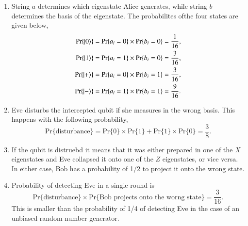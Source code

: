 \begin{solution}
\begin{enumerate}[label=(\alph*)]
    \item String $a$ determines which eigenstate Alice generates, while string $b$ determines the basis of the eigenstate. The probabilites ofthe four states are given below,
    \begin{align*}
        \text{Pr}\{\left| 0 \right\rangle\} & = \text{Pr}\{a_i=0\} \times \text{Pr}\{b_i=0\} = \frac{1}{16}, \\
        \text{Pr}\{\left| 1 \right\rangle\} & = \text{Pr}\{a_i=1\} \times \text{Pr}\{b_i=0\} = \frac{3}{16}, \\
        \text{Pr}\{\left| + \right\rangle\} & = \text{Pr}\{a_i=0\} \times \text{Pr}\{b_i=1\} = \frac{3}{16}, \\
        \text{Pr}\{\left| - \right\rangle\} & = \text{Pr}\{a_i=1\} \times \text{Pr}\{b_i=1\} = \frac{9}{16}.
    \end{align*}
    \item Eve disturbs the intercepted qubit if she measures in the wrong basis. This happens with the following probability,
    \begin{equation*}
        \text{Pr}\{\text{disturbance}\} = \text{Pr}\{0\} \times \text{Pr}\{1\} + \text{Pr}\{1\} \times \text{Pr}\{0\} = \frac{3}{8}.
    \end{equation*}
    \item If the qubit is distruebd it means that it was either prepared in one of the $X$ eigenstates and Eve collapsed it onto one of the $Z$ eigenstates, or vice versa. In either case, Bob has a probability of 1/2 to project it onto the wrong state.
    \item Probability of detecting Eve in a single round is
    \begin{equation*}
        \text{Pr}\{\text{disturbance}\} \times \text{Pr}\{\text{Bob projects onto the worng state}\} = \frac{3}{16}.
    \end{equation*}
    This is smaller than the probability of 1/4 of detecting Eve in the case of an unbiased random number generator.
\end{enumerate}
\end{solution}